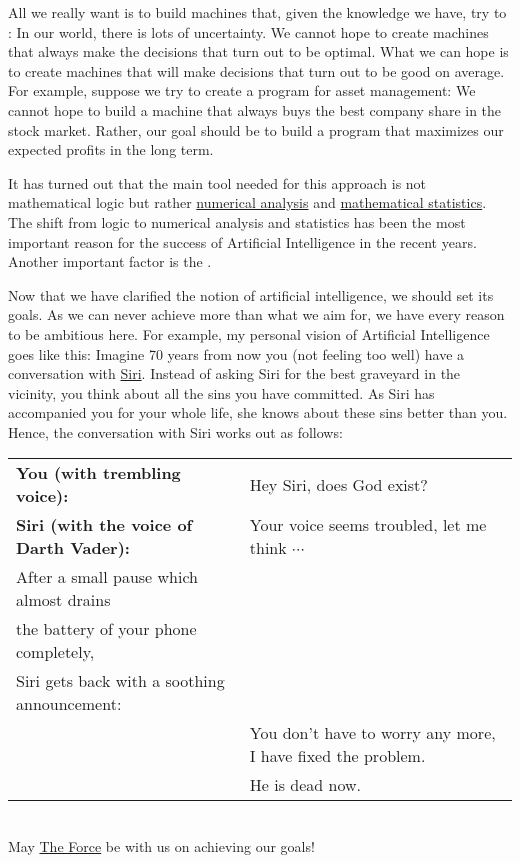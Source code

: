 \begin{enumerate}
      All we really want is to build machines that, given the knowledge we have, try to 
      :  In our world, there is lots of uncertainty.  We cannot
      hope to create 
      machines that always make the decisions that turn out to be optimal.  What we can
      hope is to create machines that will make decisions that turn out to be good on average.  For
      example, suppose we try to create a program for asset management:  We cannot hope to build a
      machine that always buys the best company share in the stock market.  Rather, our goal should
      be to build a program that maximizes our expected profits in the long term.

      It has turned out that the main tool needed for this approach is not mathematical logic but
      rather \href{https://en.wikipedia.org/wiki/Numerical_analysis}{numerical analysis} and
      \href{https://en.wikipedia.org/wiki/Mathematical_statistics}{mathematical statistics}.  The shift 
      from logic to numerical analysis and statistics has been the most important reason for the success of
      Artificial Intelligence in the recent years.  Another important factor is the 
      . 
\end{enumerate}
Now that we have clarified the notion of artificial intelligence, we should set its goals.  As we
can never achieve more than what we aim for, we have every reason to be ambitious here.  For example, my
personal vision of Artificial Intelligence goes like this: 
Imagine 70 years from now you (not feeling too well) have a conversation with
\href{https://en.wikipedia.org/wiki/Siri}{Siri}.  Instead of asking Siri for the
best graveyard in the vicinity, you think about all the sins you have committed.  As Siri has
accompanied you for your whole life, she knows about these sins better than you.  Hence,  
the conversation with Siri works out as follows: 
\\[0.2cm]
\begin{tabular}[t]{ll}
\textbf{You (with trembling voice):}           & Hey Siri, does God exist?                   \\[0.2cm]
\textbf{Siri (with the voice of Darth Vader):} & Your voice seems troubled, let me think $\cdots$ \\
After a small pause which almost drains \\
the battery of your phone completely, \\
Siri gets back with a soothing announcement: \\           
                                     & You don't have to worry any more, I have fixed the problem.  \\
                                     & He is dead now.  
\end{tabular}
\\[0.2cm]
May \href{https://en.wikipedia.org/wiki/The_Force_(Star_Wars)}{The Force} be with us on achieving our goals!
\pagebreak

